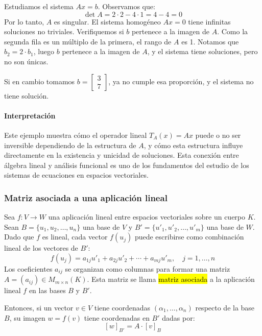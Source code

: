 Estudiamos el sistema \(Ax = b\). Observamos que:
\[
  \det A = 2 \cdot 2 - 4 \cdot 1 = 4 - 4 = 0
\]
Por lo tanto, \(A\) es singular. El sistema homogéneo \(Ax = 0\) tiene infinitas soluciones no triviales. Verifiquemos si \(b\) pertenece a la imagen de \(A\). Como la segunda fila es un múltiplo de la primera, el rango de \(A\) es 1. Notamos que \(b_2 = 2 \cdot b_1\), luego \(b\) pertenece a la imagen de \(A\), y el sistema tiene soluciones, pero no son únicas.

Si en cambio tomamos \(b = \begin{bmatrix} 3 \\ 7 \end{bmatrix}\), ya no cumple esa proporción, y el sistema no tiene solución.

\paragraph{Interpretación}

Este ejemplo muestra cómo el operador lineal \(T_A(x) = Ax\) puede o no ser inversible dependiendo de la estructura de \(A\), y cómo esta estructura influye directamente en la existencia y unicidad de soluciones. Esta conexión entre álgebra lineal y análisis funcional es uno de los fundamentos del estudio de los sistemas de ecuaciones en espacios vectoriales.

\subsubsection{Matriz asociada a una aplicación lineal}

Sea \(f:V \rightarrow W\) una aplicación lineal entre espacios vectoriales sobre un cuerpo \(K\). Sean \(B = \{u_1, u_2, \ldots, u_n\}\) una base de \(V\) y \(B' = \{u'_1, u'_2, \ldots, u'_m\}\) una base de \(W\). Dado que \(f\) es lineal, cada vector \(f(u_j)\) puede escribirse como combinación lineal de los vectores de \(B'\):
\[
f(u_j) = a_{1j} u'_1 + a_{2j} u'_2 + \cdots + a_{mj} u'_m, \quad j = 1, \dots, n
\]
Los coeficientes \(a_{ij}\) se organizan como columnas para formar una matriz \(A = (a_{ij}) \in M_{m \times n}(K)\). Esta matriz se llama \hl{matriz asociada} a la aplicación lineal \(f\) en las bases \(B\) y \(B'\).

Entonces, si un vector \(v \in V\) tiene coordenadas \((\alpha_1, \ldots, \alpha_n)\) respecto de la base \(B\), su imagen \(w = f(v)\) tiene coordenadas en \(B'\) dadas por:
\[
[w]_{B'} = A \cdot [v]_B
\]

